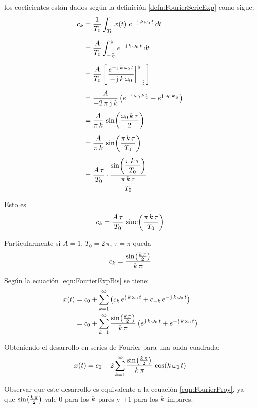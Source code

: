 \begin{mdframed}[style=ExampleFrame]
    los coeficientes están dados según la definición \ref{defn:FourierSerieExp} como sigue:
    \begin{align*}
        c_\kth &= \frac{1}{T_0} \int_{T_0} \fx[x]{t} \, e^{-\iu \, \kth \, \omega_0 \, t} \, \dif t
        \\[1ex]
        &= \frac{A}{T_0} \int_{-\frac{\tau}{2}}^{\frac{\tau}{2}} e^{-\iu \, \kth \, \omega_0 \, t} \, \dif t
        \\[1ex]
        &= \frac{A}{T_0} \barrow{\dfrac{e^{-\iu \, \kth \, \omega_0 \, t}}{-\iu \, \kth \, \omega_0}}{-\frac{\tau}{2}}{\frac{\tau}{2}}
        \\[1ex]
        &= \frac{A}{-2 \, \pi \, \iu \, \kth } \inParentheses{ e^{ -\iu \, \omega_0 \, \kth \frac{\tau}{2}} - e^{ \iu \, \omega_0 \, \kth \frac{\tau}{2}} }
        \\[1ex]
        &= \frac{A}{\pi \, \kth} \, \fx[\sin]{\frac{\omega_0 \, \kth \, \tau}{2}}
        \\[1ex]
        &= \frac{A}{\pi \, \kth} \, \fx[\sin]{\frac{\pi \, \kth \, \tau}{T_0}}
        \\[1ex]
        &= \frac{A \, \tau}{T_0} \cdot
        \frac{ \fx[\sin]{\dfrac{\pi \, \kth \, \tau}{T_0}} }{ \dfrac{\pi \, \kth \, \tau}{T_0} }
    \end{align*}

    Esto es
    \begin{equation*}
        c_\kth = \frac{A \, \tau}{T_0} \, \fx[\sinc]{\frac{\pi \, \kth \, \tau}{T_0}}
    \end{equation*}

    Particularmente si $A=1$, $T_0=2\,\pi$, $\tau=\pi$ queda
    \begin{equation*}
        c_\kth = \frac{ \fx[\sin]{\frac{\kth \, \pi}{2}} }{\kth \, \pi}
    \end{equation*}

    Según la ecuación \ref{eqn:FourierExpBis} se tiene:
    \begin{align*}
        \fx[x]{t} &= c_0 + \sum_{\kth=1}^{\infty} \inParentheses{ c_\kth \, e^{\iu \, \kth \, \omega_0 \, t} + c_{-\kth} \, e^{-\iu \, \kth \, \omega_0 \, t} }
        \\
        &= c_0 + \sum_{\kth=1}^{\infty} \frac{\fx[\sin]{\frac{\kth \, \pi}{2}}}{\kth \, \pi} \inParentheses{ e^{\iu \, \kth \, \omega_0 \, t} + e^{-\iu \, \kth \, \omega_0 \, t} }
    \end{align*}

    Obteniendo el desarrollo en series de Fourier para una onda cuadrada:
    \begin{equation*}
        \fx[x]{t} = c_0 + 2 \sum_{\kth=1}^{\infty} \frac{\fx[\sin]{\frac{\kth \, \pi}{2}}}{\kth \, \pi} \, \fx[\cos]{\kth \, \omega_0 \, t}
    \end{equation*}

    Observar que este desarrollo es equivalente a la ecuación \ref{eqn:FourierProy}, ya que $\fx[\sin]{\frac{\kth \, \pi}{2}}$ vale 0 para los $\kth$ pares y $\pm1$ para los $\kth$ impares.
\end{mdframed}

